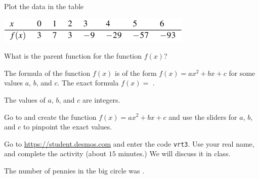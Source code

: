 \documentclass{ximera}
\begin{document}
\begin{question}
Plot the data in the table
\begin{image}
\includegraphics{ModelingTable3.png}
\end{image}
What is the parent function for the function $f(x)$?

\begin{multipleChoice}
\end{multipleChoice}
The formula of the function $f(x)$ is of the form $f(x)=ax^2+bx+c$ for some values $a$, $b$, and $c$. The exact formula $f(x)=$ .
\begin{hint}
The values of $a$, $b$, and $c$ are integers.
\end{hint}

\begin{hint}
Go to  and create the function $f(x)=ax^2+bx+c$ and use the sliders for $a$, $b$, and $c$ to pinpoint the exact values.
\end{hint}

\end{question}




\begin{question}
Go to \href{https://student.desmos.com}{https://student.desmos.com} and enter the code \verb|vrt3|. Use your real name, and complete the activity (about $15$ minutes.) We will discuss it in class.

The number of pennies in the big circle was .

\end{question}
\end{document}
